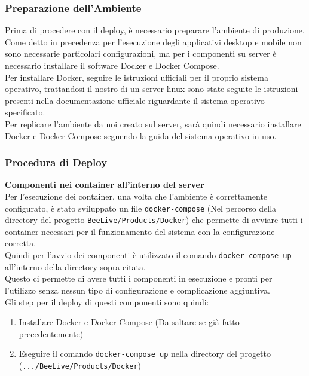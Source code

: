 \documentclass{article}
\begin{document}
\subsubsection{Preparazione dell'Ambiente}
Prima di procedere con il deploy, è necessario preparare l'ambiente di produzione.\\
Come detto in precedenza per l'esecuzione degli applicativi desktop e mobile non sono necessarie particolari configurazioni, ma per i componenti su server è necessario installare il software Docker e Docker Compose.\\
Per installare Docker, seguire le istruzioni ufficiali per il proprio sistema operativo, trattandosi il nostro di un server linux sono state seguite le istruzioni presenti nella documentazione ufficiale riguardante il sistema operativo specificato.\\
Per replicare l'ambiente da noi creato sul server, sarà quindi necessario installare Docker e Docker Compose seguendo la guida del sistema operativo in uso.

\subsubsection{Procedura di Deploy}
\textbf{Componenti nei container all'interno del server}\\
Per l'esecuzione dei container, una volta che l'ambiente è correttamente configurato, è stato sviluppato un file \texttt{docker-compose} (Nel percorso della directory del progetto \texttt{BeeLive/Products/Docker}) che permette di avviare tutti i container necessari per il funzionamento del sistema con la configurazione corretta.\\
Quindi per l'avvio dei componenti è utilizzato il comando \texttt{docker-compose up} all'interno della directory sopra citata.\\
Questo ci permette di avere tutti i componenti in esecuzione e pronti per l'utilizzo senza nessun tipo di configurazione e complicazione aggiuntiva.\\

\noindent Gli step per il deploy di questi componenti sono quindi:
\begin{enumerate}
    \item Installare Docker e Docker Compose (Da saltare se già fatto precedentemente)
    \item Eseguire il comando \texttt{docker-compose up} nella directory del progetto (\texttt{.../BeeLive/Products/Docker})
\end{enumerate}
\end{document}
